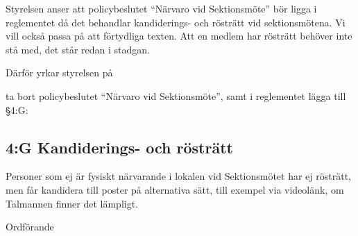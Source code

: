 \documentclass[../_main/handlingar.tex]{subfiles}
\begin{document}

Styrelsen anser att policybeslutet ``Närvaro vid Sektionsmöte'' bör ligga i reglementet då det behandlar kandiderings- och rösträtt vid sektionsmötena. Vi vill också passa på att förtydliga texten. Att en medlem har rösträtt behöver inte stå med, det står redan i stadgan.

Därför yrkar styrelsen på

\begin{attsatser}
    \att ta bort policybeslutet ``Närvaro vid Sektionsmöte'', samt
    \att i reglementet lägga till \S4:G:\par
        \subsection*{4:G Kandiderings- och rösträtt}
        Personer som ej är fysiskt närvarande i lokalen vid Sektionsmötet har ej rösträtt, men får kandidera till poster på alternativa sätt, till exempel via videolänk, om Talmannen finner det lämpligt.
\end{attsatser}

\begin{signatures}{1}
    \ist
    \signature{\ordf}{Ordförande}
\end{signatures}
\end{document}
